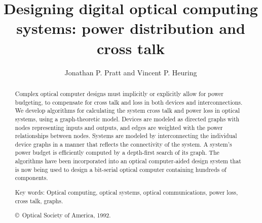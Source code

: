 %
\newcommand{\MF}{{\large{\manual META}\-{\manual FONT}}}
\newcommand{\manual}{rm}        %
\newcommand\bs{\char '134 }     %
%


\title{Designing digital optical computing systems:      power
distribution and cross talk}

\author{Jonathan P. Pratt and Vincent P. Heuring }

\address{
When this work was performed, both the authors were with the Boulder
Optoelectronic Computing Systems Center and Department of Electrical and
Computer Engineering, University of Colorado, Campus Box 425, Boulder,
Colorado 80309-0425.  They are now with the Department of Radiology,
University of Colorado Health Sciences Center, Box A034, 4200 East Ninth
Avenue, Denver, Colorado 80262.  }

\maketitle

\begin{abstract}
Complex optical computer designs must implicitly or explicitly allow for
power budgeting, to compensate for cross talk and loss in both devices and
interconnections.  We develop algorithms for calculating the system cross
talk and power loss in optical systems, using a graph-theoretic model.
Devices are modeled as directed graphs with nodes representing inputs and
outputs, and edges are weighted with the power relationships between nodes.
Systems are modeled by interconnecting the individual device graphs in a
manner that reflects the connectivity of the system.  A system's power
budget is efficiently computed by a depth-first search of its graph.  The
algorithms have been incorporated into an optical computer-aided design
system that is now being used to design a bit-serial optical computer
containing hundreds of components.

Key words: Optical computing, optical systems, optical communications,
power loss, cross talk, graphs.
\begin{center}
{\copyright\ Optical Society of America, 1992.}
\end{center}
\end{abstract}

